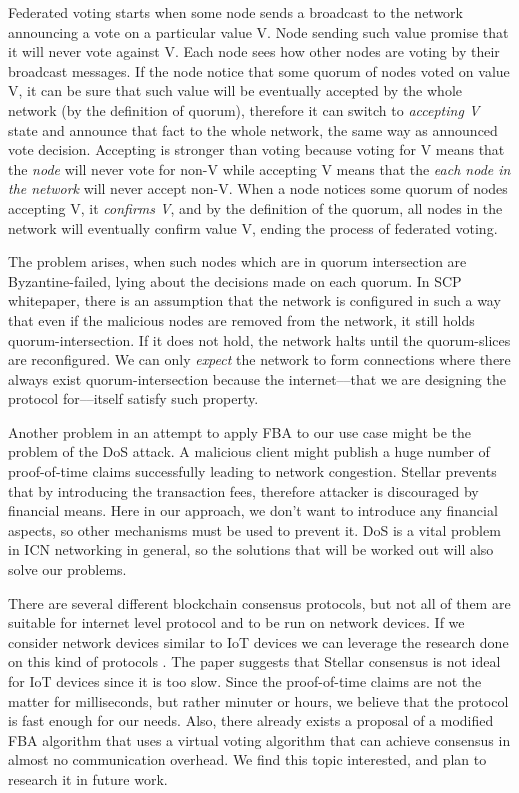 Federated voting starts when some node sends a broadcast to the network announcing a vote on a particular value V. Node sending such value promise that it will never vote against V. Each node sees how other nodes are voting by their broadcast messages. If the node notice that some quorum of nodes voted on value V, it can be sure that such value will be eventually accepted by the whole network (by the definition of quorum), therefore it can switch to \textit{accepting V} state and announce that fact to the whole network, the same way as announced vote decision. Accepting is stronger than voting because voting for V means that the \textit{node} will never vote for non-V while accepting V means that the \textit{each node in the network} will never accept non-V. When a node notices some quorum of nodes accepting V, it \textit{confirms V}, and by the definition of the quorum, all nodes in the network will eventually confirm value V, ending the process of federated voting.

The problem arises, when such nodes which are in quorum intersection are Byzantine-failed, lying about the decisions made on each quorum. In SCP whitepaper, there is an assumption that the network is configured in such a way that even if the malicious nodes are removed from the network, it still holds quorum-intersection. If it does not hold, the network halts until the quorum-slices are reconfigured.
We can only \textit{expect} the network to form connections where there always exist quorum-intersection because the internet––that we are designing the protocol for––itself satisfy such property.

Another problem in an attempt to apply FBA to our use case might be the problem of the DoS attack. A malicious client might publish a huge number of proof-of-time claims successfully leading to network congestion. Stellar prevents that by introducing the transaction fees, therefore attacker is discouraged by financial means. Here in our approach, we don't want to introduce any financial aspects, so other mechanisms must be used to prevent it. DoS is a vital problem in ICN networking in general\cite{gasti2013and}, so the solutions that will be worked out will also solve our problems. 

There are several different blockchain consensus protocols, but not all of them are suitable for internet level protocol and to be run on network devices.
If we consider network devices similar to IoT devices we can leverage the research done on this kind of protocols \cite{salimitari2018survey}. The paper suggests that Stellar consensus is not ideal for IoT devices since it is too slow.
Since the proof-of-time claims are not the matter for milliseconds, but rather minuter or hours, we believe that the protocol is fast enough for our needs.
Also, there already exists a proposal of a modified FBA algorithm\cite{FCPpdf50:online} that uses a virtual voting algorithm that can achieve consensus in almost no communication overhead. We find this topic interested, and plan to research it in future work.

